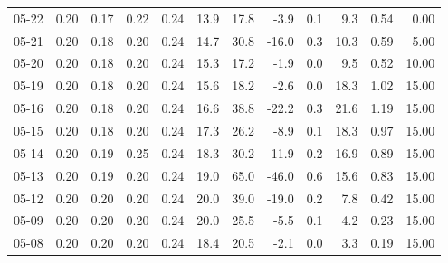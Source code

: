 \begin{threeparttable}
{\begin{tabular}{lrrrrrrrrrrr}
  05-22 &          0.20 &          0.17 &          0.22 &        0.24 &                13.9 &                17.8 &       -3.9 &                 0.1 &              9.3 &            0.54 &                   0.00 \\
  05-21 &          0.20 &          0.18 &          0.20 &        0.24 &                14.7 &                30.8 &      -16.0 &                 0.3 &             10.3 &            0.59 &                   5.00 \\
  05-20 &          0.20 &          0.18 &          0.20 &        0.24 &                15.3 &                17.2 &       -1.9 &                 0.0 &              9.5 &            0.52 &                  10.00 \\
  05-19 &          0.20 &          0.18 &          0.20 &        0.24 &                15.6 &                18.2 &       -2.6 &                 0.0 &             18.3 &            1.02 &                  15.00 \\
  05-16 &          0.20 &          0.18 &          0.20 &        0.24 &                16.6 &                38.8 &      -22.2 &                 0.3 &             21.6 &            1.19 &                  15.00 \\
  05-15 &          0.20 &          0.18 &          0.20 &        0.24 &                17.3 &                26.2 &       -8.9 &                 0.1 &             18.3 &            0.97 &                  15.00 \\
  05-14 &          0.20 &          0.19 &          0.25 &        0.24 &                18.3 &                30.2 &      -11.9 &                 0.2 &             16.9 &            0.89 &                  15.00 \\
  05-13 &          0.20 &          0.19 &          0.20 &        0.24 &                19.0 &                65.0 &      -46.0 &                 0.6 &             15.6 &            0.83 &                  15.00 \\
  05-12 &          0.20 &          0.20 &          0.20 &        0.24 &                20.0 &                39.0 &      -19.0 &                 0.2 &              7.8 &            0.42 &                  15.00 \\
  05-09 &          0.20 &          0.20 &          0.20 &        0.24 &                20.0 &                25.5 &       -5.5 &                 0.1 &              4.2 &            0.23 &                  15.00 \\
  05-08 &          0.20 &          0.20 &          0.20 &        0.24 &                18.4 &                20.5 &       -2.1 &                 0.0 &              3.3 &            0.19 &                  15.00 \\

\end{tabular}}
\end{threeparttable}
